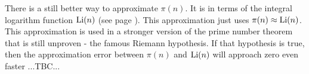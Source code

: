\medskip
There is a still better way to approximate $\pi(n)$. It is in terms of the integral logarithm function $\operatorname{Li}(n)$ (see page \pageref{Eq:LogarithmicIntegral}). This approximation just uses $\pi(n) \approx \operatorname{Li}(n)$. This approximation is used in a stronger version of the prime number theorem that is still unproven - the famous Riemann hypothesis. If that hypothesis is true, then the approximation error between $\pi(n)$ and $\operatorname{Li}(n)$ will approach zero even faster ...TBC...









